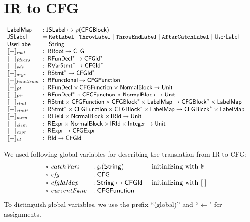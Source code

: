 \chapter{IR to CFG}

\[
\begin{array}{l@{~~}l}
\LabelMap &: \JSLabel \mapsto \powerset{\CFGBlock}\\
\JSLabel &= \RetLabel \mid \ThrowLabel \mid \ThrowEndLabel \mid \AfterCatchLabel \mid \UserLabel\\
\UserLabel &= \String\\
\transfun{-}_{\emph{root}} &: \IRRoot \rightarrow \CFG \\
\transfun{-}_{\emph{fdvars}} &: \IRFunDecl^{*} \rightarrow \CFGId^{*} \\
\transfun{-}_{\emph{vds}} &: \IRVarStmt^{*} \rightarrow \CFGId^{*} \\
\transfun{-}_{\emph{args}} &: \IRStmt^{*} \rightarrow \CFGId^{*} \\
\transfun{-}_{\emph{functional}} &: \IRFunctional \rightarrow \CFGFunction \\
\transfun{-}_{\emph{fd}} &: \IRFunDecl \times \CFGFunction \times \NormalBlock \rightarrow \Unit \\
\transfun{-}_{\emph{fd}^{*}} &: \IRFunDecl^{*} \times \CFGFunction \times \NormalBlock \rightarrow \Unit \\
\transfun{-}_{\emph{stmt}} &: \IRStmt \times \CFGFunction \times \CFGBlock^{*} \times \LabelMap \rightarrow \CFGBlock^{*} \times \LabelMap\\
\transfun{-}_{\emph{stmt}^{*}} &: \IRStmt^{*} \times \CFGFunction \times \CFGBlock^{*} \times \LabelMap \rightarrow \CFGBlock^{*} \times \LabelMap\\
\transfun{-}_{\emph{mem}} &: \IRField \times \NormalBlock \times \IRId \rightarrow \Unit \\
\transfun{-}_{\emph{elem}} &: \IRExpr \times \NormalBlock \times \IRId \times \Integer \rightarrow \Unit \\
\transfun{-}_{\emph{expr}} &: \IRExpr \rightarrow \CFGExpr \\
\transfun{-}_{\emph{id}} &: \IRId \rightarrow \CFGId \\
\end{array}
\]

We used following global variables for describing the translation from IR to CFG:
\[
\begin{array}{lll}
*\ \emph{catchVars} &: \wp(\mbox{\textsf{String}}) & \text{ initializing with } \emptyset\\
*\ \emph{cfg} &: \mbox{\textsf{CFG}} &\\
*\ \emph{cfgIdMap} &: \mbox{\textsf{String}} \mapsto \mbox{\textsf{CFGId}} & \text{ initializing with } [\ ]\\
*\ \emph{currentFunc} &: \mbox{\textsf{CFGFunction}} & \\
\end{array}
\]
To distinguish global variables, we use the prefix ``(global)'' and ``$\leftarrow$" for assignments.

